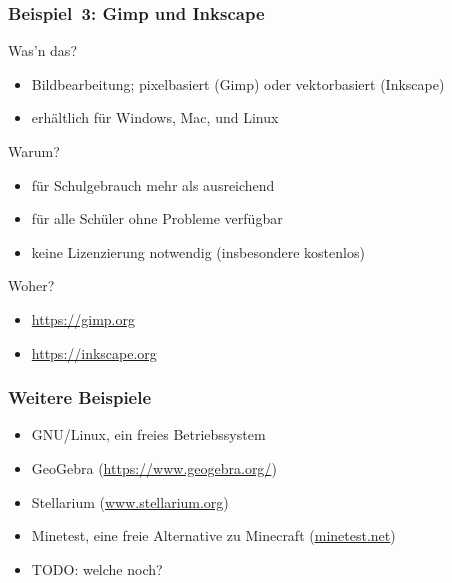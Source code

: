 \documentclass{beamer}
\begin{document}
\begin{frame}
  \frametitle{Beispiel~3: Gimp und Inkscape}

  \onslide<+->

  \begin{block}{Was'n das?}
    \begin{itemize}
    \item Bildbearbeitung; pixelbasiert (Gimp) oder vektorbasiert (Inkscape)
    \item erhältlich für Windows, Mac, und Linux
    \end{itemize}
  \end{block}

  \onslide<+->

  \begin{block}{Warum?}
    \begin{itemize}
    \item für Schulgebrauch mehr als ausreichend
    \item für alle Schüler ohne Probleme verfügbar
    \item keine Lizenzierung notwendig (insbesondere kostenlos)
    \end{itemize}
  \end{block}

  \onslide<+->

  \begin{block}{Woher?}
    \begin{itemize}
    \item \url{https://gimp.org}
    \item \url{https://inkscape.org}
    \end{itemize}
  \end{block}


\end{frame}

\begin{frame}
  \frametitle{Weitere Beispiele}

  \onslide<+->

  \begin{itemize}
  \item GNU/Linux, ein freies Betriebssystem %
  \item GeoGebra (\url{https://www.geogebra.org/})
  \item Stellarium (\url{www.stellarium.org})
  \item Minetest, eine freie Alternative zu Minecraft (\url{minetest.net})
  \item TODO: welche noch?
  \end{itemize}

\end{frame}
\end{document}
